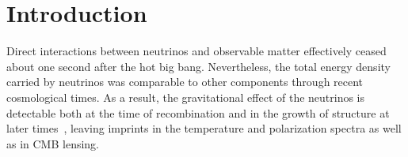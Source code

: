 \begin{quotation}





%

\end{quotation}

\section{Introduction}



Direct interactions between neutrinos and observable matter effectively ceased about one second after the hot big bang.  Nevertheless, the total energy density carried by neutrinos was comparable to other components through recent cosmological times.  As a result, the gravitational effect of the neutrinos is detectable both at the time of recombination and in the growth of structure at later times~\cite{Abazajian:2013oma}, leaving imprints in the temperature and polarization spectra as well as in CMB lensing.

